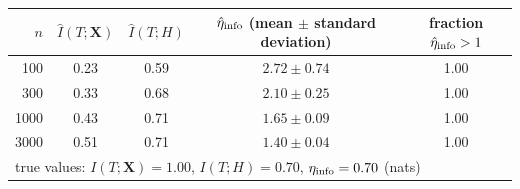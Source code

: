 \begin{tabular}{r c c c c}
\hline
$n$ & $\hat I(T;\mathbf X)$ & $\hat I(T;H)$ & $\hat\eta_{\rm info}$ (mean $\pm$ standard deviation) & fraction $\hat\eta_{\rm info}>1$ \\
\hline
100 & 0.23 & 0.59 & $2.72\pm0.74$ & 1.00 \\
300 & 0.33 & 0.68 & $2.10\pm0.25$ & 1.00 \\
1000 & 0.43 & 0.71 & $1.65\pm0.09$ & 1.00 \\
3000 & 0.51 & 0.71 & $1.40\pm0.04$ & 1.00 \\
\hline
\multicolumn{5}{l}{true values: $I(T;\mathbf X)=1.00$, $I(T;H)=0.70$, $\eta_{\rm info}=0.70$ (nats)}\\
\end{tabular}
